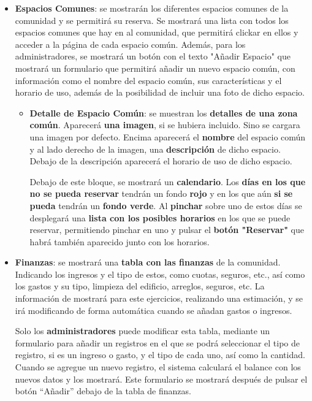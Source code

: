 \begin{appendices}
\begin{itemize}
\begin{itemize}
\begin{itemize}
			\item \textbf{Espacios Comunes}: se mostrarán los diferentes espacios comunes de la comunidad y se permitirá su reserva. Se mostrará una lista con todos los espacios comunes que hay en al comunidad, que permitirá clickar en ellos y acceder a la página de cada espacio común. Además, para los administradores, se mostrará un botón con el texto "Añadir Espacio" que mostrará un formulario que permitirá añadir un nuevo espacio común, con información como el nombre del espacio común, sus características y el horario de uso, además de la posibilidad de incluir una foto de dicho espacio.
			
			\begin{itemize}
				\item \textbf{Detalle de Espacio Común}: se muestran los \textbf{detalles de una zona común}. Aparecerá \textbf{una imagen}, si se hubiera incluido. Sino se cargara una imagen por defecto. Encima aparecerá el \textbf{nombre} del espacio común y al lado derecho de la imagen, una \textbf{descripción} de dicho espacio. Debajo de la descripción aparecerá el horario de uso de dicho espacio.
				
				Debajo de este bloque, se mostrará un \textbf{calendario}. Los \textbf{días en los que no se pueda reservar} tendrán un fondo \textbf{rojo} y en los que aún \textbf{si se pueda} tendrán un \textbf{fondo verde}. Al \textbf{pinchar} sobre uno de estos días se desplegará una \textbf{lista con los posibles horarios} en los que se puede reservar, permitiendo pinchar en uno y pulsar el \textbf{botón "Reservar"} que habrá también aparecido junto con los horarios.
			\end{itemize}
			
			\item \textbf{Finanzas}: se mostrará una \textbf{tabla con las finanzas} de la comunidad. Indicando los ingresos y el tipo de estos, como cuotas, seguros, etc., así como los gastos y su tipo, limpieza del edificio, arreglos, seguros, etc. La información de mostrará para este ejercicios, realizando una estimación, y se irá modificando de forma automática cuando se añadan gastos o ingresos. 
			
			Solo los \textbf{administradores} puede modificar esta tabla, mediante un formulario para añadir un registros en el que se podrá seleccionar el tipo de registro, si es un ingreso o gasto, y el tipo de cada uno, así como la cantidad. Cuando se agregue un nuevo registro, el sistema calculará el balance con los nuevos datos y los mostrará. Este formulario se mostrará después de pulsar el botón ``Añadir'' debajo de la tabla de finanzas.
			

\end{itemize}
\end{itemize}
\end{itemize}
\end{appendices}
